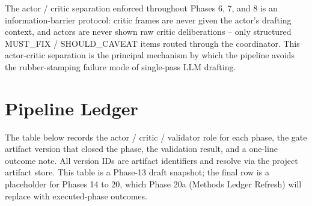 \documentclass[11pt]{article}
\begin{document}
The actor / critic separation enforced throughout Phases 6, 7, and 8 is an information-barrier protocol: critic frames are never given the actor's drafting context, and actors are never shown raw critic deliberations -- only structured MUST\_FIX / SHOULD\_CAVEAT items routed through the coordinator. This actor-critic separation is the principal mechanism by which the pipeline avoids the rubber-stamping failure mode of single-pass LLM drafting.

\section{Pipeline Ledger}\label{sec-methods-pipeline}

The table below records the actor / critic / validator role for each phase, the gate artifact version that closed the phase, the validation result, and a one-line outcome note. All version IDs are artifact identifiers and resolve via the project artifact store. This table is a Phase-13 draft snapshot; the final row is a placeholder for Phases 14 to 20, which Phase 20a (Methods Ledger Refresh) will replace with executed-phase outcomes.
\end{document}
